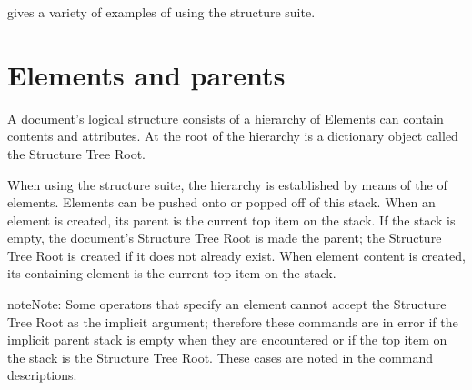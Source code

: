 \documentclass[letterpaper,12pt,english,openany,oneside]{sphinxmanual}
\begin{document}
 gives a variety of examples of using the structure suite.


\section{Elements and parents}
\label{\detokenize{pdfmark_Logical:elements-and-parents}}
A document’s logical structure consists of a hierarchy of  Elements can contain contents and attributes. At the root of the hierarchy is a dictionary object called the Structure Tree Root.

When using the structure suite, the hierarchy is established by means of the  of elements. Elements can be pushed onto or popped off of this stack. When an element is created, its parent is the current top item on the stack. If the stack is empty, the document’s Structure Tree Root is made the parent; the Structure Tree Root is created if it does not already exist. When element content is created, its containing element is the current top item on the stack.

\begin{sphinxadmonition}{note}{Note:}
Some operators that specify an element cannot accept the Structure Tree Root as the implicit argument; therefore these commands are in error if the implicit parent stack is empty when they are encountered or if the top item on the stack is the Structure Tree Root. These cases are noted in the command descriptions.
\end{sphinxadmonition}
\end{document}
